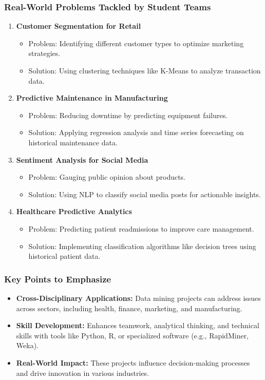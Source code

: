 \documentclass[aspectratio=169]{beamer}
\begin{document}
\begin{frame}[fragile]
    \frametitle{Real-World Problems Tackled by Student Teams}
    \begin{enumerate}
        \item \textbf{Customer Segmentation for Retail}
        \begin{itemize}
            \item Problem: Identifying different customer types to optimize marketing strategies.
            \item Solution: Using clustering techniques like K-Means to analyze transaction data.
        \end{itemize}
        
        \item \textbf{Predictive Maintenance in Manufacturing}
        \begin{itemize}
            \item Problem: Reducing downtime by predicting equipment failures.
            \item Solution: Applying regression analysis and time series forecasting on historical maintenance data.
        \end{itemize}

        \item \textbf{Sentiment Analysis for Social Media}
        \begin{itemize}
            \item Problem: Gauging public opinion about products.
            \item Solution: Using NLP to classify social media posts for actionable insights.
        \end{itemize}

        \item \textbf{Healthcare Predictive Analytics}
        \begin{itemize}
            \item Problem: Predicting patient readmissions to improve care management.
            \item Solution: Implementing classification algorithms like decision trees using historical patient data.
        \end{itemize}
    \end{enumerate}
\end{frame}

\begin{frame}[fragile]
    \frametitle{Key Points to Emphasize}
    \begin{itemize}
        \item \textbf{Cross-Disciplinary Applications:} Data mining projects can address issues across sectors, including health, finance, marketing, and manufacturing.
        \item \textbf{Skill Development:} Enhances teamwork, analytical thinking, and technical skills with tools like Python, R, or specialized software (e.g., RapidMiner, Weka).
        \item \textbf{Real-World Impact:} These projects influence decision-making processes and drive innovation in various industries.
    \end{itemize}
\end{frame}
\end{document}
